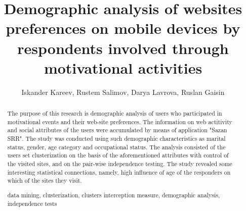\documentclass[runningheads,a4paper]{llncs}
\newcommand{\keywords}[1]{\par\addvspace\baselineskip
\noindent\keywordname\enspace\ignorespaces#1}
\begin{document}
\mainmatter  %

\title{Demographic analysis of websites preferences on mobile devices by respondents involved through motivational activities}





\author{Iskander Kareev, Rustem Salimov, Darya Lavrova, Ruslan Gaisin}
%


%
%

\maketitle

\begin{abstract}
The purpose of this research is demographic analysis of users who participated in motivational events and their web-site preferences. The information on web actitivity and social attributes of the users were accumulated by means of application "Sazan SRR". The study was conducted using such demographic characteristics as marital status, gender, age category and occupational status. The analysis consisted of the users set clusterization on the basis of the aforementioned attributes with control of the visited sites, and on the pair-wise independence testing. The study revealed some interesting statistical connections, namely, high influence of age of the responders on which of the sites they visit.


\keywords{data mining, clusterization, clusters interception measure, demographic analysis, independence tests}
\end{abstract}
\end{document}
